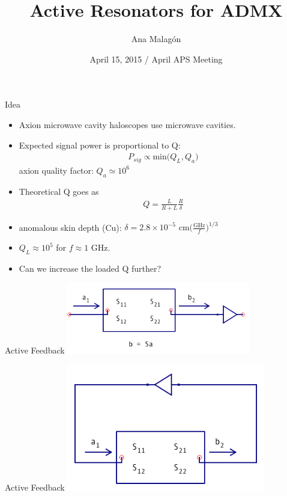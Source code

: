 \documentclass{beamer}
\title[April APS]
{Active Resonators for ADMX}
\author[Malagon]
{Ana Malag\'on}
\institute[University of Washington]
{University of Washington, ADMX Collaboration}
\date[April 15, 2015]
{April 15, 2015 / April APS Meeting}
\begin{document}
\begin{frame}
\titlepage
\end{frame}

\begin{frame}{Idea}
\begin{itemize}
\item Axion microwave cavity haloscopes use microwave cavities.

\item Expected signal power is proportional to Q:
\begin{align*}
P_{sig} \propto \text{min}\big(Q_L, Q_a\big)
\end{align*}
axion quality factor: $Q_a \simeq 10^6$
\item Theoretical Q goes as 
\begin{align*}
Q = \frac{L}{R+L}\frac{R}{\delta}
\end{align*}

\item anomalous skin depth (Cu): $\delta = 2.8\times10^{-5}\text{ cm}\bigg(\frac{\text{GHz}}{f}\bigg)^{1/3}$

\item  $Q_L \approx 10^5$ for $f \approx 1$ GHz.


\item Can we increase the loaded Q further? 
\end{itemize}
\end{frame}

\begin{frame}{Active Feedback}
\centering
\includegraphics[width=0.6\textwidth]{export_sparams_10}
\end{frame}

\begin{frame}{Active Feedback}
\centering
\includegraphics[width=0.65\textwidth]{export_sparams_4}
\end{frame}
\end{document}
